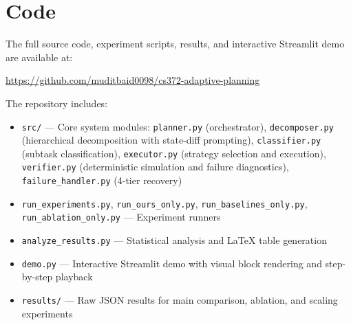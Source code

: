 \documentclass{article}
\begin{document}
\appendix
\section{Code}

The full source code, experiment scripts, results, and interactive Streamlit demo are available at:

\begin{center}
\url{https://github.com/muditbaid0098/cs372-adaptive-planning}
\end{center}

\noindent The repository includes:
\begin{itemize}[leftmargin=*]
    \item \texttt{src/} --- Core system modules: \texttt{planner.py} (orchestrator), \texttt{decomposer.py} (hierarchical decomposition with state-diff prompting), \texttt{classifier.py} (subtask classification), \texttt{executor.py} (strategy selection and execution), \texttt{verifier.py} (deterministic simulation and failure diagnostics), \texttt{failure\_handler.py} (4-tier recovery)
    \item \texttt{run\_experiments.py}, \texttt{run\_ours\_only.py}, \texttt{run\_baselines\_only.py}, \texttt{run\_ablation\_only.py} --- Experiment runners
    \item \texttt{analyze\_results.py} --- Statistical analysis and LaTeX table generation
    \item \texttt{demo.py} --- Interactive Streamlit demo with visual block rendering and step-by-step playback
    \item \texttt{results/} --- Raw JSON results for main comparison, ablation, and scaling experiments
\end{itemize}
\end{document}
